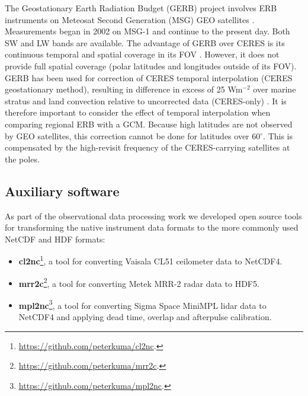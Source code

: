 The Geostationary Earth Radiation Budget (GERB) project involves ERB instruments
on Meteosat Second Generation (MSG) GEO satellites \citep{harries2005}.
Measurements began in 2002 on MSG-1 and continue to the present day.
Both SW and LW bands are available. The advantage of GERB
over CERES is its continuous temporal and spatial coverage in its FOV
\citep{sandford2003}. However, it does not provide full spatial coverage
(polar latitudes and longitudes outside of its FOV).
GERB has been used for correction of CERES temporal interpolation
(CERES geostationary method), resulting in difference in excess of 25 Wm$^{-2}$
over marine stratus and land convection relative to uncorrected data
(CERES-only) \citep{doelling2013}. It is therefore important to consider
the effect of temporal interpolation when comparing regional ERB with a GCM.
Because high latitudes are not observed by GEO satellites, this correction
cannot be done for latitudes over 60$^{\circ}$. This is compensated by the high-revisit
frequency of the CERES-carrying satellites at the poles.


\subsection{Auxiliary software}

As part of the observational data processing work we developed
open source tools for transforming the native instrument data formats to
the more commonly used NetCDF and HDF formats:

\begin{itemize}
\item \textbf{cl2nc}\footnote{\url{https://github.com/peterkuma/cl2nc}.}, a tool for converting Vaisala CL51
ceilometer data to NetCDF4.
\item \textbf{mrr2c}\footnote{\url{https://github.com/peterkuma/mrr2c}.}, a tool for converting
Metek MRR-2 radar data to HDF5.
\item \textbf{mpl2nc}\footnote{\url{https://github.com/peterkuma/mpl2nc}.}, a
tool for converting Sigma Space MiniMPL lidar data to NetCDF4 and applying
dead time, overlap and afterpulse calibration.
\end{itemize}

